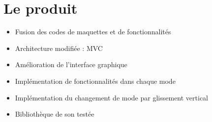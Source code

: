 \documentclass{beamer}
\begin{document}
\section{Le produit}
	\begin{frame}

		\begin{itemize}
			\item Fusion des codes de maquettes et de fonctionnalités
			\item Architecture modifiée : MVC
			\item Amélioration de l'interface graphique
			\item Implémentation de fonctionnalités dans chaque mode
			\item Implémentation du changement de mode par glissement vertical
			\item Bibliothèque de son testée
		\end{itemize}

	\end{frame}
\end{document}
